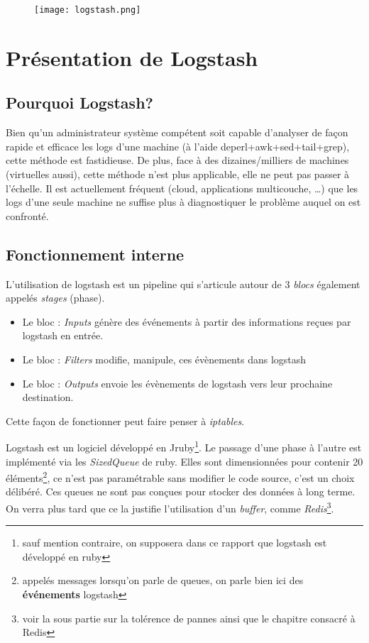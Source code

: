 \begin{figure}[H]
\center
\texttt{[image: logstash.png]}
\label{fig:logstashlogo.png}
\end{figure}
\section{Présentation de Logstash}

\subsection{Pourquoi Logstash?}
Bien qu'un administrateur système compétent soit capable d'analyser de façon rapide 
et efficace les logs d'une machine (à l'aide deperl+awk+sed+tail+grep), cette méthode
est fastidieuse. De plus, face à des dizaines/milliers de machines (virtuelles aussi), 
cette méthode n'est plus applicable, elle ne peut pas passer à l'échelle.
Il est actuellement fréquent (cloud, applications multicouche, \ldots) que les logs 
d'une seule machine ne suffise plus à diagnostiquer le problème auquel on est confronté.

\subsection{Fonctionnement interne}
L'utilisation de logstash est un pipeline qui s'articule autour de 3 \emph{blocs} 
également appelés \emph{stages} (phase).
\begin{itemize}
    \item   Le bloc : \emph{Inputs} génère des événements à partir des informations reçues
    par logstash en entrée.
    \item   Le bloc : \emph{Filters} modifie, manipule, ces évènements dans logstash
    \item   Le bloc : \emph{Outputs} envoie les évènements de logstash vers leur 
    prochaine destination.
\end{itemize}

Cette façon de fonctionner peut faire penser à \emph{iptables}.

Logstash est un logiciel développé en Jruby\footnote{sauf mention contraire, on supposera
dans ce rapport que logstash est développé en ruby}. Le passage d'une phase 
à l'autre est implémenté via les \emph{SizedQueue} de ruby. Elles sont dimensionnées 
pour contenir 20 éléments\footnote{appelés messages lorsqu'on parle de queues, 
on parle bien ici des \textbf{événements} logstash}, ce n'est pas paramétrable sans 
modifier le code source, c'est un choix délibéré. Ces queues ne sont pas conçues 
pour stocker des données à long terme. On verra plus tard que ce la justifie l'utilisation
d'un \textit{buffer}, comme \emph{Redis}\footnote{voir la sous partie sur la tolérence
de pannes ainsi que le chapitre consacré à Redis}.


